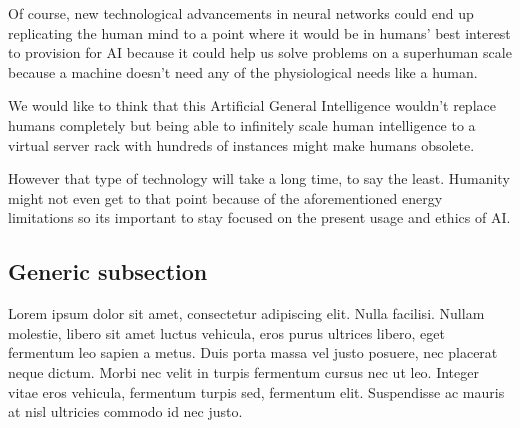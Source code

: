 \documentclass[letterpaper,11pt,leqno]{article}
\begin{document}
Of course, new technological advancements in neural networks could end up replicating the human mind to a point where it would be in humans' best interest to provision for AI because it could help us solve problems on a superhuman scale because a machine doesn't need any of the physiological needs like a human.

We would like to think that this Artificial General Intelligence wouldn't replace humans completely but being able to infinitely scale human intelligence to a virtual server rack with hundreds of instances might make humans obsolete. 

However that type of technology will take a long time, to say the least. Humanity might not even get to that point because of the aforementioned energy limitations so its important to stay focused on the present usage and ethics of AI. 

\subsection{Generic subsection}

Lorem ipsum dolor sit amet, consectetur adipiscing elit. Nulla facilisi. Nullam molestie, libero sit amet luctus vehicula, eros purus ultrices libero, eget fermentum leo sapien a metus. Duis porta massa vel justo posuere, nec placerat neque dictum. Morbi nec velit in turpis fermentum cursus nec ut leo. Integer vitae eros vehicula, fermentum turpis sed, fermentum elit. Suspendisse ac mauris at nisl ultricies commodo id nec justo. 

\pagebreak

\printbibliography
\end{document}
